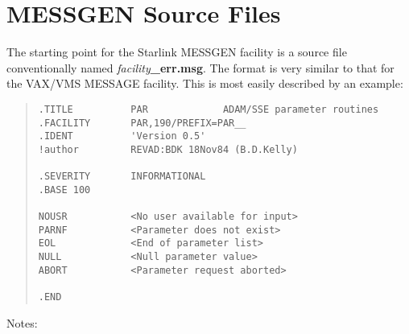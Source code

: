 \section{MESSGEN Source Files}
The starting point for the Starlink MESSGEN facility is a source file 
conventionally named {\em facility}{\bf \_err.msg}. The format is very
similar to that for the VAX/VMS MESSAGE facility. This is most easily
described by an example:
\begin{small}
\begin{quote} \begin{verbatim}
.TITLE          PAR             ADAM/SSE parameter routines
.FACILITY       PAR,190/PREFIX=PAR__
.IDENT          'Version 0.5'
!author         REVAD:BDK 18Nov84 (B.D.Kelly)

.SEVERITY       INFORMATIONAL
.BASE 100

NOUSR           <No user available for input>
PARNF           <Parameter does not exist>
EOL             <End of parameter list>
NULL            <Null parameter value>
ABORT           <Parameter request aborted>

.END
\end{verbatim} \end{quote}
\end{small}
Notes:
